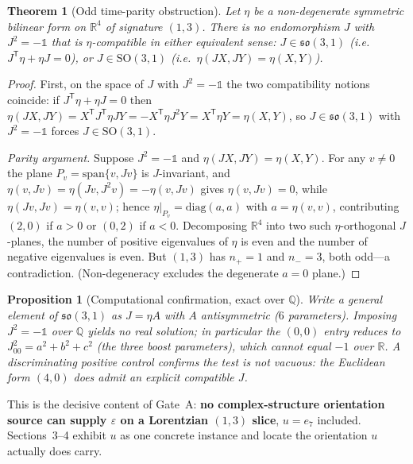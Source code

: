 \documentclass[11pt]{article}
\newcommand{\R}{\mathbb{R}}
\newcommand{\Q}{\mathbb{Q}}
\newcommand{\so}{\mathfrak{so}}
\newcommand{\id}{\mathbb{1}}
\theoremstyle{plain}\newtheorem{theorem}{Theorem}
\theoremstyle{plain}\newtheorem{proposition}{Proposition}
\theoremstyle{plain}\newtheorem{corollary}{Corollary}
\theoremstyle{definition}\newtheorem{remark}{Remark}
\begin{document}
\begin{theorem}[Odd time-parity obstruction]\label{thm:parity}
Let $\eta$ be a non-degenerate symmetric bilinear form on $\R^4$ of signature $(1,3)$.
There is no endomorphism $J$ with $J^2=-\id$ that is $\eta$-compatible in either equivalent
sense: $J\in\so(3,1)$ (i.e.\ $J^{\mathsf T}\eta+\eta J=0$), or $J\in\mathrm{SO}(3,1)$ (i.e.\
$\eta(JX,JY)=\eta(X,Y)$).
\end{theorem}

\begin{proof}
First, on the space of $J$ with $J^2=-\id$ the two compatibility notions coincide: if
$J^{\mathsf T}\eta+\eta J=0$ then $\eta(JX,JY)=X^{\mathsf T}J^{\mathsf T}\eta JY=
-X^{\mathsf T}\eta J^2Y=X^{\mathsf T}\eta Y=\eta(X,Y)$, so $J\in\so(3,1)$ with $J^2=-\id$
forces $J\in\mathrm{SO}(3,1)$.

\emph{Parity argument.} Suppose $J^2=-\id$ and $\eta(JX,JY)=\eta(X,Y)$. For any $v\neq0$ the
plane $P_v=\mathrm{span}\{v,Jv\}$ is $J$-invariant, and $\eta(v,Jv)=\eta(Jv,J^2v)=
-\eta(v,Jv)$ gives $\eta(v,Jv)=0$, while $\eta(Jv,Jv)=\eta(v,v)$; hence $\eta|_{P_v}=
\mathrm{diag}(a,a)$ with $a=\eta(v,v)$, contributing $(2,0)$ if $a>0$ or $(0,2)$ if $a<0$.
Decomposing $\R^4$ into two such $\eta$-orthogonal $J$-planes, the number of positive
eigenvalues of $\eta$ is even and the number of negative eigenvalues is even. But $(1,3)$
has $n_+=1$ and $n_-=3$, both odd---a contradiction. (Non-degeneracy excludes the
degenerate $a=0$ plane.)
\end{proof}

\begin{proposition}[Computational confirmation, exact over $\Q$]\label{prop:sumsq}
Write a general element of $\so(3,1)$ as $J=\eta A$ with $A$ antisymmetric
($6$ parameters). Imposing $J^2=-\id$ over $\Q$ yields no real solution; in particular the
$(0,0)$ entry reduces to $J^2_{00}=a^2+b^2+c^2$ (the three boost parameters), which cannot
equal $-1$ over $\R$. A discriminating positive control confirms the test is not vacuous:
the Euclidean form $(4,0)$ \emph{does} admit an explicit compatible $J$.
\end{proposition}

This is the decisive content of Gate~A: \textbf{no complex-structure orientation source can
supply $\varepsilon$ on a Lorentzian $(1,3)$ slice}, $u=e_7$ included. Sections~3--4 exhibit
$u$ as one concrete instance and locate the orientation $u$ actually does carry.

\end{document}
